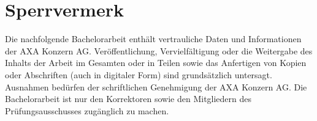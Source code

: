 \chapter*{Sperrvermerk}\label{ch:sperrvermerk}

Die nachfolgende Bachelorarbeit enthält vertrauliche Daten und Informationen der AXA Konzern AG. Veröffentlichung,  Vervielfältigung oder die Weitergabe des Inhalts der Arbeit im Gesamten oder in Teilen sowie das Anfertigen von Kopien oder Abschriften  (auch in digitaler Form)  sind grundsätzlich untersagt.
Ausnahmen bedürfen der schriftlichen Genehmigung der AXA Konzern AG.
Die Bachelorarbeit ist nur den Korrektoren sowie den Mitgliedern des Prüfungsausschusses zugänglich zu machen.